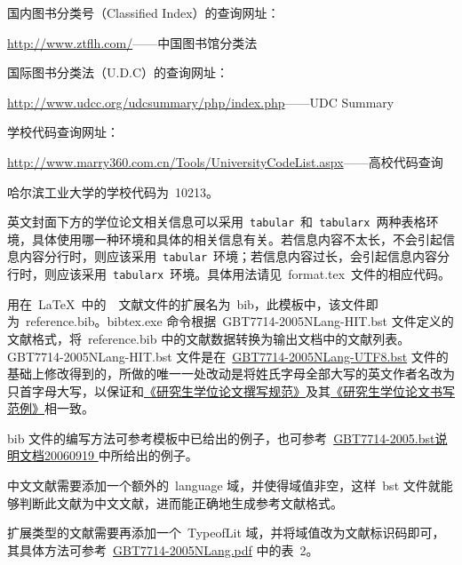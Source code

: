 

国内图书分类号（Classif\/ied Index）的查询网址：

\centerline{\href{http://www.ztflh.com/}{http://www.ztflh.com/}——中国图书馆分类法}
国际图书分类法（U.D.C）的查询网址：

\centerline{\href{http://www.udcc.org/udcsummary/php/index.php}{http://www.udcc.org/udcsummary/php/index.php}——UDC Summary}
学校代码查询网址：

\centerline{\href{http://www.marry360.com.cn/Tools/UniversityCodeList.aspx}{http://www.marry360.com.cn/Tools/UniversityCodeList.aspx}——高校代码查询}
\noindent 哈尔滨工业大学的学校代码为~10213。

英文封面下方的学位论文相关信息可以采用~\verb|tabular|~和~\verb|tabularx|~两种表格环境，具体使用哪一种环境和具体的相关信息有关。若信息内容不太长，不会引起信息内容分行时，则应该采用~\verb|tabular|~环境；若信息内容过长，会引起信息内容分行时，则应该采用~\verb|tabularx|~环境。具体用法请见~format.tex~文件的相应代码。

用在~\LaTeX~中的~\BibTeX~文献文件的扩展名为~bib，此模板中，该文件即为~reference.bib。bibtex.exe 命令根据~GBT7714-2005NLang-HIT.bst 文件定义的文献格式，将~reference.bib 中的文献数据转换为输出文档中的文献列表。GBT7714-2005NLang-HIT.bst 文件是在~\href{http://bbs.ctex.org/attachment.php?aid=MjA3MDh8ZDcyMjc2MTN8MTMyNTYzNjY4OHxhZTg4bkNCUVJiRzA0WmU3TmlMbVdTUVExa0xtV2puWWc0dkdqbVJhbTVMdy9mVQ\%3D\%3D}{GBT7714-2005NLang-UTF8.bst} 文件的基础上修改得到的，所做的唯一一处改动是将姓氏字母全部大写的英文作者名改为只首字母大写，以保证和\href{http://hitgs.hit.edu.cn/xuewei/guifan.doc}{《研究生学位论文撰写规范》}及其\href{http://hitgs.hit.edu.cn/xuewei/fanli.doc}{《研究生学位论文书写范例》}相一致。

bib 文件的编写方法可参考模板中已给出的例子，也可参考~\href{http://bbs.ctex.org/attachment.php?aid=MTk3OTd8NjY1ODc5OGV8MTMyNTY0MTEyMnxhZGZkYWpsa0I2RGZwNDR5Z1lyeStjb1dKRS8rTnJub3lvT2FkNDNJbHl1UWVkVQ\%3D\%3D}{GBT7714-2005.bst说明文档20060919
} 中所给出的例子。

中文文献需要添加一个额外的~language 域，并使得域值非空，这样~bst 文件就能够判断此文献为中文文献，进而能正确地生成参考文献格式。

扩展类型的文献需要再添加一个~TypeofLit 域，并将域值改为文献标识码即可，其具体方法可参考~\href{http://bbs.ctex.org/attachment.php?aid=MTk4MDB8OTk5Zjc2ZGV8MTMyNTYwMTUyMHxmZjBlSmtZSXFLZ1I1QjBhZTBLM0RTZGlyQnZxMGUvUVVqektGUUwyOTVYcm1ESQ\%3D\%3D}{GBT7714-2005NLang.pdf} 中的表~2。

